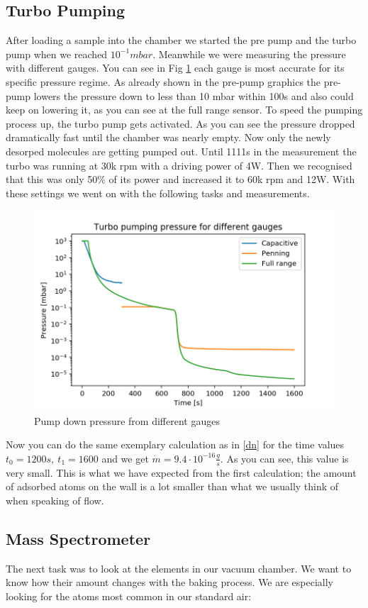 \documentclass[]{article}
\begin{document}
\subsection{Turbo Pumping}
After loading a sample into the chamber we started the pre pump and the turbo pump when we reached $10^{-1}mbar$. Meanwhile we were measuring the pressure with different gauges. You can see in Fig \ref{fig:pumpingpressure} each gauge is most accurate for its specific pressure regime.
As already shown in the pre-pump graphics the pre-pump lowers the pressure down to less than 10 mbar within 100s and also could keep on lowering it, as you can see at the full range sensor. To speed the pumping process up, the turbo pump gets activated. As you can see the pressure dropped dramatically fast until the chamber was nearly empty. Now only the newly desorped molecules are getting pumped out. Until 1111s in the measurement the turbo was running at 30k rpm with a driving power of 4W. Then we recognised that this was only 50\% of its power and increased it to 60k rpm and 12W. With these settings we went on with the following tasks and measurements.

\begin{figure}[!h]
	\centering
	\includegraphics[width=0.7\linewidth]{Plots/PumpingPressure}
	\caption{Pump down pressure from different gauges}
	\label{fig:pumpingpressure}
\end{figure}

Now you can do the same exemplary calculation as in \ref{dn} for the time values $t_0=1200s, \: t_1=1600$ and we get $ \dot{m} = 9.4\cdot10^{-16} \frac{g}{s}$. 
As you can see, this value is very small. This is what we have expected from the first calculation; the amount of adsorbed atoms on the wall is a lot smaller than what we usually think of when speaking of flow.


\subsection{Mass Spectrometer}
The next task was to look at the elements in our vacuum chamber. We want to know how their amount changes with the baking process. We are especially looking for the atoms most common in our standard air:
\end{document}
